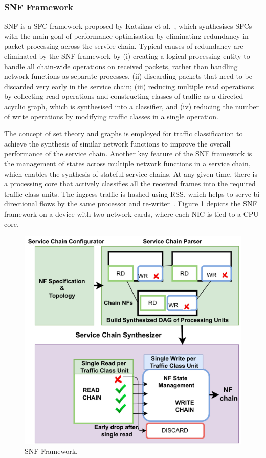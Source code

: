 \documentclass[futureinternet,review,accept,pdftex,moreauthors]{Definitions/mdpi}
\begin{document}
\subsubsection{SNF Framework}
\label{SNF}
SNF is a SFC framework proposed by Katsikas {et al.}~\cite{katsikas2016snf}, which synthesises SFCs with the main goal of performance optimisation by eliminating redundancy in packet processing across the service chain. Typical causes of redundancy are eliminated by the SNF framework by (i) creating a logical processing entity to handle all chain-wide operations on received packets, rather than handling network functions as separate processes, (ii) discarding packets that need to be discarded very early in the service chain; (iii) reducing multiple read operations by collecting read operations and constructing classes of traffic as a directed acyclic graph, which is synthesised into a classifier, and (iv) reducing the number of write operations by modifying traffic classes in a single operation.

The concept of set theory and graphs is employed for traffic classification to achieve the synthesis of similar network functions to improve the overall performance of the service chain. Another key feature of the SNF framework is the management of states across multiple network functions in a service chain, which enables the synthesis of stateful service chains. At any given time, there is a processing core that actively classifies all the received frames into the required traffic class units. The ingress traffic is hashed using RSS, which helps to serve bi-directional flows by the same processor and re-writer~\cite{katsikas2016snf}.  Figure \ref{SNF-picture} depicts the SNF framework on a device with two network cards, where each NIC is tied to a CPU core.        




\begin{figure}[H]%
\includegraphics[width=0.6\columnwidth]{SNF.pdf}
\caption{SNF Framework.}
\label{SNF-picture}
\end{figure}
\end{document}

